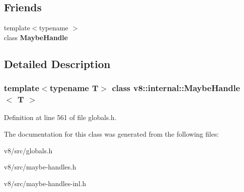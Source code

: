 \subsection*{Friends}
\begin{DoxyCompactItemize}
\item 
\mbox{\label{classv8_1_1internal_1_1MaybeHandle_a43ca95cbc5708225727b3674f4690233}} 
{\footnotesize template$<$typename $>$ }\\class {\bfseries Maybe\+Handle}
\end{DoxyCompactItemize}


\subsection{Detailed Description}
\subsubsection*{template$<$typename T$>$\newline
class v8\+::internal\+::\+Maybe\+Handle$<$ T $>$}



Definition at line 561 of file globals.\+h.



The documentation for this class was generated from the following files\+:\begin{DoxyCompactItemize}
\item 
v8/src/globals.\+h\item 
v8/src/maybe-\/handles.\+h\item 
v8/src/maybe-\/handles-\/inl.\+h\end{DoxyCompactItemize}
